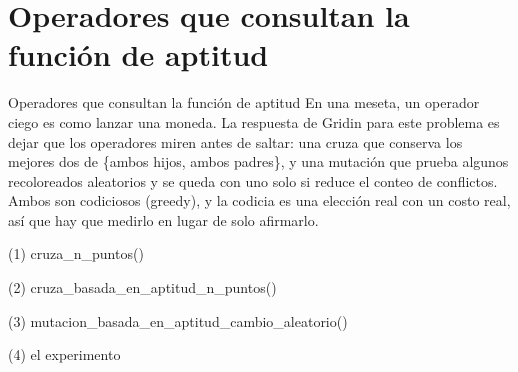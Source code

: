 
\section{Operadores que consultan la función de aptitud}

\begin{frame}{Operadores que consultan la función de aptitud}
En una meseta, un operador ciego es como lanzar una moneda. La respuesta de Gridin para este problema
es dejar que los operadores miren antes de saltar: una cruza que conserva los mejores
dos de \{ambos hijos, ambos padres\}, y una mutación que prueba algunos recoloreados
aleatorios y se queda con uno solo si reduce el conteo de conflictos. Ambos son
codiciosos (greedy), y la codicia es una elección real con un costo real, así que hay que medirlo en lugar de
solo afirmarlo.
\end{frame}

\begin{frame}[fragile]{(1) cruza\_n\_puntos()}

\end{frame}

\begin{frame}[fragile]{(2) cruza\_basada\_en\_aptitud\_n\_puntos()}

\end{frame}

\begin{frame}[fragile]{(3) mutacion\_basada\_en\_aptitud\_cambio\_aleatorio()}

\end{frame}

\begin{frame}[fragile]{(4) el experimento}

\end{frame}

